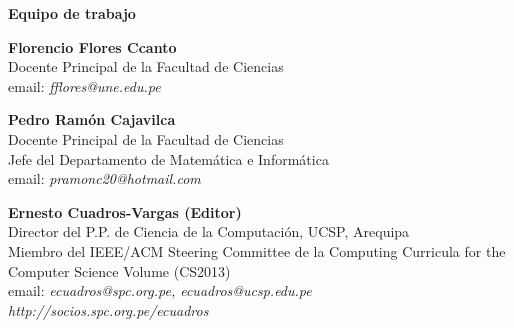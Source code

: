 \begin{center}
{\bf \Huge Equipo de trabajo}
\end{center}
\vspace{1cm}

\begin{center}
\textbf{Florencio Flores Ccanto}\\
Docente Principal de la Facultad de Ciencias\\
email: \textit{fflores@une.edu.pe}\\
\end{center}

\begin{center}
\textbf{Pedro Ramón Cajavilca}\\
Docente Principal de la Facultad de Ciencias\\
Jefe del Departamento de Matemática e Informática\\
email: \textit{pramonc20@hotmail.com}\\
\end{center}

\begin{center}
\textbf{Ernesto Cuadros-Vargas (Editor)}\\
Director del P.P. de Ciencia de la Computación, UCSP, Arequipa\\
Miembro del IEEE/ACM Steering Committee de la Computing Curricula for the Computer Science Volume (CS2013)\\
email: \textit{ecuadros@spc.org.pe, ecuadros@ucsp.edu.pe}\\
\textit{http://socios.spc.org.pe/ecuadros}
\end{center}

\newpage

